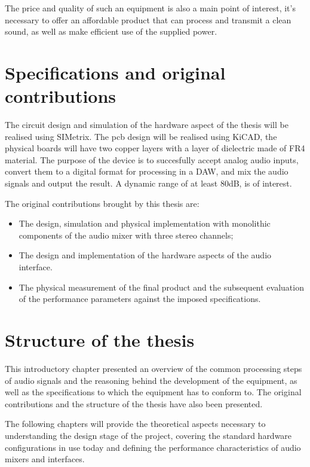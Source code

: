The price and quality of such an equipment is also a main point of interest,
it's necessary to offer an affordable product that can process and transmit a
clean sound, as well as make efficient use of the supplied power.

\section{Specifications and original contributions}

The circuit design and simulation of the hardware aspect of the thesis will be
realised using SIMetrix. The \ac{pcb} design will be realised using KiCAD, the
physical boards will have two copper layers with a layer of dielectric made of
FR4 material. The purpose of the device is to succesfully accept analog
audio inputs, convert them to a digital format for processing in a DAW, and mix
the audio signals and output the result. A dynamic range of at least 80dB, is
of interest.

The original contributions brought by this thesis are:
\begin{itemize}
    \item The design, simulation and physical implementation with monolithic
        components of the audio mixer with three stereo channels;
    \item The design and implementation of the hardware
        aspects of the audio interface.
    \item The physical measurement of the final product and the subsequent
        evaluation of the performance parameters against the imposed
        specifications.
\end{itemize}

\section{Structure of the thesis}

This introductory chapter presented an overview of the common processing steps
of audio signals and the reasoning behind the development of the equipment, as
well as the specifications to which the equipment has to conform to.
The original contributions and the structure of the thesis have also been
presented.

The following chapters will provide the theoretical aspects necessary to
understanding the design stage of the project, covering the standard hardware
configurations in use today and defining the performance characteristics of
audio mixers and interfaces.

